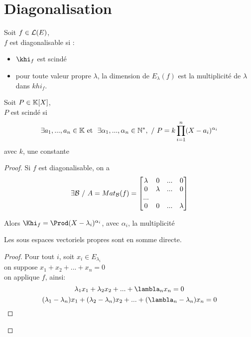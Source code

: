 \documentclass[../main.tex]{subfile}
\begin{document}
\part{Diagonalisation}


\begin{theo}
	Soit $f \in \mathcal{L}(E)$, \\
	$f$ est diagonalisable si :
\begin{itemize}	
	\item $\khi_f$ est scindé
	\item pour toute valeur propre $\lambda$, la dimension de $E_\lambda(f)$ est la multiplicité de $\lambda$ dans $khi_f$.
\end{itemize}
\end{theo}

\begin{rap}
	Soit $P \in \mathbb{K}[X]$, \\
	$P$ est scindé si
	$$\exists a_1, ..., a_n \in \mathbb{K} \ \text{et } \ \exists \alpha_1, ..., \alpha_n \in \mathbb{N}^*, \ / \ P = k \prod\limits_{i=1}^n (X-a_i)^{\alpha_i}$$
	avec $k$, une constante
\end{rap}


\begin{proof}
	Si $f$ est diagonalisable, on a 
	$$\exists \BBB \ / \ A = Mat_\BBB(f) = 
\begin{bmatrix}
	\lambda & 0 & ... & 0\\
	0 & \lambda & ... & 0\\
	... \\
	0 & 0 & ... & \lambda
\end{bmatrix}
	$$

	Alors $\Khi_f = \Prod(X - \lambda_i)^{\alpha_i}$, avec $\alpha_i$, la multiplicité

\begin{lemme}
	Les sous espaces vectoriels propres sont en somme directe.
\end{lemme}

\begin{proof}
	Pour tout $i$, soit $x_i \in E_{\lambda_i}$\\
	on suppose $x_1 + x_2 + ... + x_n = 0$\\
	on applique $f$, ainsi:
	$$\lambda_1x_1 + \lambda_2x_2 + ... + \lambla_nx_n = 0$$
	$$(\lambda_1 - \lambda_n)x_1 + (\lambda_2 - \lambda_n)x_2 + ... + (\lambla_n - \lambda_n)x_n = 0$$
\end{proof}
\end{proof}
\end{document}
